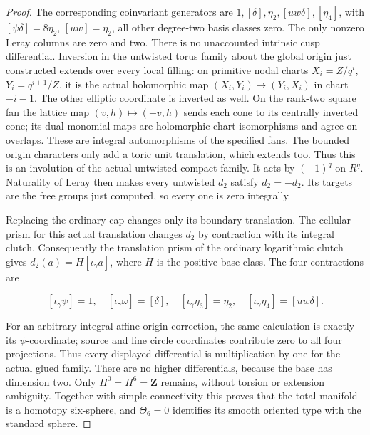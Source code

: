 \begin{proof}
The corresponding coinvariant generators are
\(1,[\delta],\eta_2,[uw\delta],[\eta_4]\), with
\([\psi\delta]=8\eta_2\), \([uw]=\eta_2\), all other
degree-two basis classes zero.  The only nonzero Leray columns
are zero and two.  There is no unaccounted intrinsic cusp
differential.  Inversion in the untwisted torus family about the
global origin just constructed extends over every local filling:
on primitive nodal charts
\(X_i=Z/q^i\), \(Y_i=q^{i+1}/Z\), it is the actual holomorphic
map \((X_i,Y_i)\mapsto(Y_i,X_i)\) in chart \(-i-1\).
The other elliptic coordinate is inverted as well.  On the
rank-two square fan the lattice map \((v,h)\mapsto(-v,h)\)
sends each cone to its centrally inverted cone; its dual monomial
maps are holomorphic chart isomorphisms and agree on overlaps.
These are integral automorphisms of the specified fans.
The bounded origin characters only add a toric unit translation,
which extends too.  Thus this is an involution of the actual
untwisted compact family.  It acts by \((-1)^q\) on \(R^q\).
Naturality of Leray then makes every untwisted \(d_2\) satisfy
\(d_2=-d_2\).  Its targets are the free groups just computed,
so every one is zero integrally.

Replacing the ordinary cap changes only its boundary translation.
The cellular prism for this actual translation changes \(d_2\)
by contraction with its integral clutch.  Consequently the
translation prism of the ordinary
logarithmic clutch gives
\(d_2(a)=H[\iota_{\widehat\gamma}a]\), where \(H\) is the
positive base class.  The four contractions are

\[
 [\iota_\gamma\psi]=1,\quad
 [\iota_\gamma\omega]=[\delta],\quad
 [\iota_\gamma\eta_3]=\eta_2,\quad
 [\iota_\gamma\eta_4]=[uw\delta].
\]

For an arbitrary integral affine origin correction, the same
calculation is exactly its \(\psi\)-coordinate; source and line
circle coordinates contribute zero to all four projections.
Thus every displayed differential is multiplication by one for
the actual glued family.  There are no higher differentials,
because the base has dimension two.  Only
\(H^0=H^6=\mathbf Z\) remains, without torsion or extension
ambiguity.  Together with simple connectivity this proves that
the total manifold is a homotopy six-sphere, and \(\Theta_6=0\)
identifies its smooth oriented type with the standard sphere.


\end{proof}
